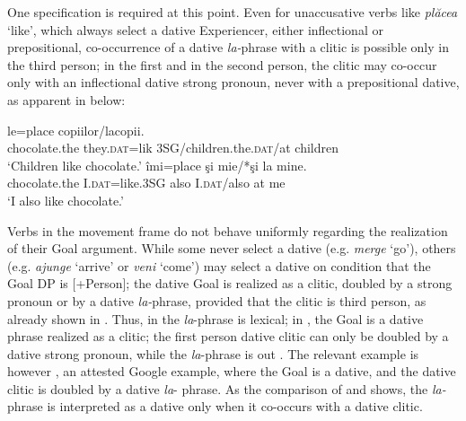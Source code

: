 \documentclass[output=paper,modfonts,nonflat,newtxmath]{langsci/langscibook}
\begin{document}
One specification is required at this point. Even for unaccusative verbs like \textit{plăcea} ‘like’, which always select a dative Experiencer, either inflectional or prepositional, co-occurrence of a dative \textit{la-}phrase with a clitic is possible only in the third person; in the first and in the second person, the clitic may co-occur only with an inflectional dative strong pronoun, never with a prepositional dative, as apparent in  below:

\ea%
    \label{ex:cornilescu:10}
    \ea
     {le=place}  {copiilor}/{la}{copii}. 	\\
    	chocolate.the  they.\textsc{dat}=lik 3SG/children.the.\textsc{dat}/at children	\\  	
    \glt‘Children like chocolate.’
    \ex \label{ex:cornilescu:10b}
     {îmi=place} {şi} {mie}/*şi {la} mine.\\
    	chocolate.the  I.\textsc{dat}=like.3SG also I.\textsc{dat}/also at me\\
    \glt ‘I also like chocolate.’  
    \z 
    \z
    
Verbs in the movement frame do not behave uniformly regarding the realization of their Goal argument. While some never select a dative (e.g. \textit{merge} ‘go’), others (e.g. \textit{ajunge} ‘arrive’ or \textit{veni} ‘come’) may select a dative on condition that the Goal DP is [+Person]; the dative Goal is realized as a clitic, doubled by a strong pronoun or by a dative \textit{la-}phrase, provided that the clitic is third person, as already shown in . Thus, in  the \textit{la}-phrase is lexical; in , the Goal is a dative phrase realized as a clitic; the first person dative clitic can only be doubled by a dative strong pronoun, while the \textit{la}{}-phrase is out . The relevant example is however , an attested Google example, where the Goal is a dative, and the dative clitic is doubled by a dative \textit{la}{}- phrase. As the comparison of  and  shows, the \textit{la-}phrase is interpreted as a dative only when it co-occurs with a dative clitic.
\end{document}
